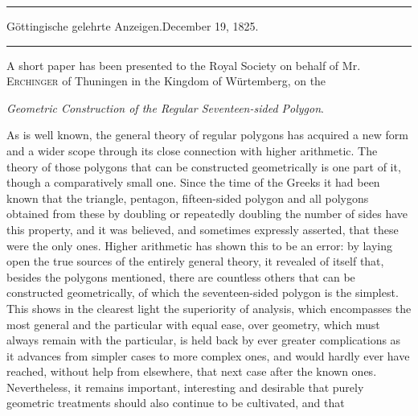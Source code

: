 \begin{center}
\rule{.86\linewidth}{.3pt}\par
Göttingische gelehrte Anzeigen.\quad December 19, 1825.\par
\rule{.86\linewidth}{.3pt}
\end{center}
A short paper has been presented to the Royal Society on behalf of Mr. \textsc{Erchinger} of Thuningen in the Kingdom of Würtemberg, on the
\begin{center}\emph{Geometric Construction of the Regular Seventeen-sided Polygon}.\end{center}
As is well known, the general theory of regular polygons has acquired a new form and a wider scope through its close connection with higher arithmetic. The theory of those polygons that can be constructed geometrically is one part of it, though a comparatively small one. Since the time of the Greeks it had been known that the triangle, pentagon, fifteen-sided polygon and all polygons obtained from these by doubling or repeatedly doubling the number of sides have this property, and it was believed, and sometimes expressly asserted, that these were the only ones. Higher arithmetic has shown this to be an error: by laying open the true sources of the entirely general theory, it revealed of itself that, besides the polygons mentioned, there are countless others that can be constructed geometrically, of which the seventeen-sided polygon is the simplest. This shows in the clearest light the superiority of analysis, which encompasses the most general and the particular with equal ease, over geometry, which must always remain with the particular, is held back by ever greater complications as it advances from simpler cases to more complex ones, and would hardly ever have reached, without help from elsewhere, that next case after the known ones. Nevertheless, it remains important, interesting and desirable that purely geometric treatments should also continue to be cultivated, and that
